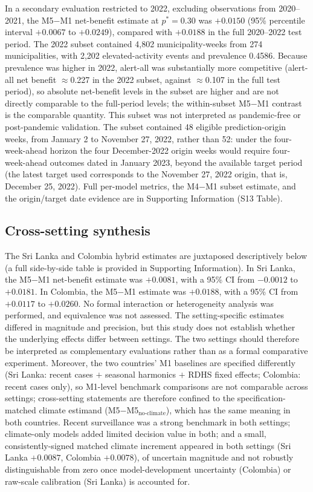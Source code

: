 \documentclass[11pt,a4paper]{article}
\begin{document}
In a secondary evaluation restricted to 2022, excluding observations from 2020--2021, the M5$-$M1 net-benefit estimate at $p^*=0.30$ was $+0.0150$ (95\% percentile interval $+0.0067$ to $+0.0249$), compared with $+0.0188$ in the full 2020--2022 test period. The 2022 subset contained 4{,}802 municipality-weeks from 274 municipalities, with 2{,}202 elevated-activity events and prevalence 0.4586. Because prevalence was higher in 2022, alert-all was substantially more competitive (alert-all net benefit $\approx$0.227 in the 2022 subset, against $\approx$0.107 in the full test period), so absolute net-benefit levels in the subset are higher and are not directly comparable to the full-period levels; the within-subset M5$-$M1 contrast is the comparable quantity. This subset was not interpreted as pandemic-free or post-pandemic validation. The subset contained 48 eligible prediction-origin weeks, from January 2 to November 27, 2022, rather than 52: under the four-week-ahead horizon the four December-2022 origin weeks would require four-week-ahead outcomes dated in January 2023, beyond the available target period (the latest target used corresponds to the November 27, 2022 origin, that is, December 25, 2022). Full per-model metrics, the M4$-$M1 subset estimate, and the origin/target date evidence are in Supporting Information (S13 Table).

\subsection{Cross-setting synthesis}
The Sri Lanka and Colombia hybrid estimates are juxtaposed descriptively below (a full side-by-side table is provided in Supporting Information). In Sri Lanka, the M5$-$M1 net-benefit estimate was $+0.0081$, with a 95\% CI from $-0.0012$ to $+0.0181$. In Colombia, the M5$-$M1 estimate was $+0.0188$, with a 95\% CI from $+0.0117$ to $+0.0260$. No formal interaction or heterogeneity analysis was performed, and equivalence was not assessed. The setting-specific estimates differed in magnitude and precision, but this study does not establish whether the underlying effects differ between settings. The two settings should therefore be interpreted as complementary evaluations rather than as a formal comparative experiment. Moreover, the two countries' M1 baselines are specified differently (Sri Lanka: recent cases $+$ seasonal harmonics $+$ RDHS fixed effects; Colombia: recent cases only), so M1-level benchmark comparisons are not comparable across settings; cross-setting statements are therefore confined to the specification-matched climate estimand (M5$-$M5$_{\text{no-climate}}$), which has the same meaning in both countries. Recent surveillance was a strong benchmark in both settings; climate-only models added limited decision value in both; and a small, consistently-signed matched climate increment appeared in both settings (Sri Lanka $+0.0087$, Colombia $+0.0078$), of uncertain magnitude and not robustly distinguishable from zero once model-development uncertainty (Colombia) or raw-scale calibration (Sri Lanka) is accounted for.
\end{document}

